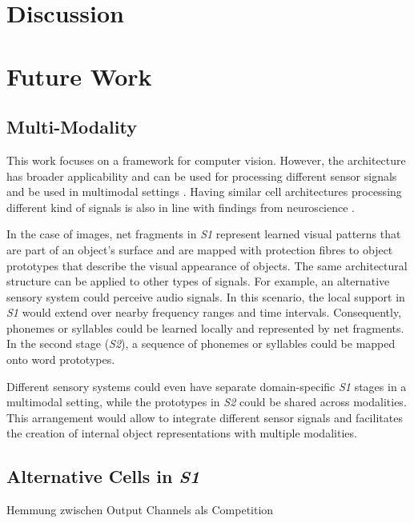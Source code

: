 
\section{Discussion}



\section{Future Work}



\subsection{Multi-Modality}
This work focuses on a framework for computer vision. However, the architecture has broader applicability and can be used for processing different sensor signals and be used in multimodal settings \cite{ngiam_multimodal_2011, liu_learn_2018, baltrusaitis_multimodal_2019}.
Having similar cell architectures processing different kind of signals is also in line with findings from neuroscience .

In the case of images, net fragments in \emph{S1} represent learned visual patterns that are part of an object's surface and are mapped with protection fibres to object prototypes that describe the visual appearance of objects. 
The same architectural structure can be applied to other types of signals. For example, an alternative sensory system could perceive audio signals. In this scenario, the local support in \emph{S1} would extend over nearby frequency ranges and time intervals. Consequently, phonemes or syllables could be learned locally and represented by net fragments. In the second stage (\emph{S2}), a sequence of phonemes or syllables could be mapped onto word prototypes.

Different sensory systems could even have separate domain-specific \emph{S1} stages in a multimodal setting, while the prototypes in \emph{S2} could be shared across modalities. This arrangement would allow to integrate different sensor signals and facilitates the creation of internal object representations with multiple modalities.



\subsection{Alternative Cells in \emph{S1}}
Hemmung zwischen Output Channels als Competition

